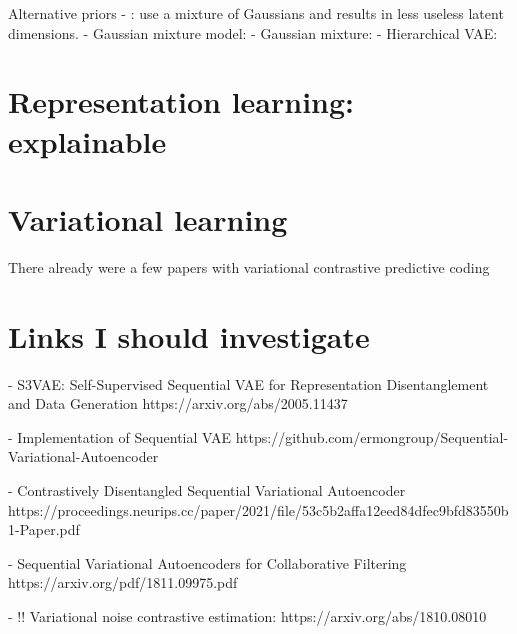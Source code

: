 	Alternative priors
		- \cite{tomczakVAEVampPrior2018}: use a mixture of Gaussians and results in less useless latent dimensions.
		- Gaussian mixture model: \cite{guoVariationalAutoencoderOptimizing2020}
		- Gaussian mixture: \cite{nalisnickApproximateInferenceDeep}
		- Hierarchical VAE: \cite{vahdatNVAEDeepHierarchical2020}








\section{Representation learning: explainable}
\section{Variational learning}
There already were a few papers with variational contrastive predictive coding

\section{Links I should investigate}
- S3VAE: Self-Supervised Sequential VAE for Representation Disentanglement and Data Generation
https://arxiv.org/abs/2005.11437

- Implementation of Sequential VAE
https://github.com/ermongroup/Sequential-Variational-Autoencoder

- Contrastively Disentangled Sequential Variational Autoencoder
https://proceedings.neurips.cc/paper/2021/file/53c5b2affa12eed84dfec9bfd83550b1-Paper.pdf

- Sequential Variational Autoencoders for Collaborative Filtering
https://arxiv.org/pdf/1811.09975.pdf

- !! Variational noise contrastive estimation:
https://arxiv.org/abs/1810.08010